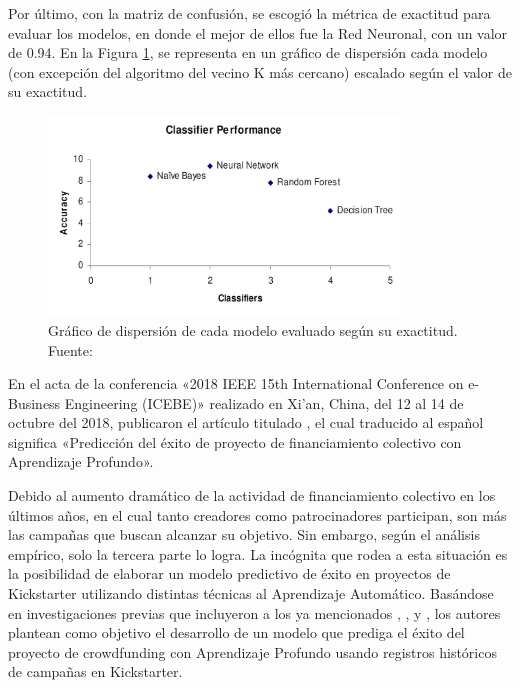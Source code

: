 Por último, con la matriz de confusión, se escogió la métrica de exactitud para evaluar los modelos, en donde el mejor de ellos fue la Red Neuronal, con un valor de 0.94. En la Figura \ref{2:fig121}, se representa en un gráfico de dispersión cada modelo (con excepción del algoritmo del vecino K más cercano) escalado según el valor de su exactitud.

\begin{figure}[!ht]
	\begin{center}
		\includegraphics[width=0.83\textwidth]{2/figures/kamath2018.jpg}
		\caption[Gráfico de dispersión de cada modelo evaluado según su exactitud]{Gráfico de dispersión de cada modelo evaluado según su exactitud.\\
			Fuente: \cite{pr_kamath2018suplearn}}
		\label{2:fig121}
	\end{center}
\end{figure}

En el acta de la conferencia «2018 IEEE 15th International Conference on e-Business Engineering (ICEBE)» realizado en Xi'an, China, del 12 al 14 de octubre del 2018, \cite{pr_yu2018deeplearning} publicaron el artículo titulado , el cual traducido al español significa «Predicción del éxito de proyecto de financiamiento colectivo con Aprendizaje Profundo».

Debido al aumento dramático de la actividad de financiamiento colectivo en los últimos años, en el cual tanto creadores como patrocinadores participan, son más las campañas que buscan alcanzar su objetivo. Sin embargo, según el análisis empírico, solo la tercera parte lo logra. La incógnita que rodea a esta situación es la posibilidad de elaborar un modelo predictivo de éxito en proyectos de Kickstarter utilizando distintas técnicas al Aprendizaje Automático. Basándose en investigaciones previas que incluyeron a los ya mencionados \cite{pr_chen2013kickpredict}, \cite{pr_li2016predcrowd}, \cite{pr_sawhney2016usingLT} y \cite{pr_kamath2018suplearn}, los autores plantean como objetivo el desarrollo de un modelo que prediga el éxito del proyecto de crowdfunding con Aprendizaje Profundo usando registros históricos de campañas en Kickstarter.

